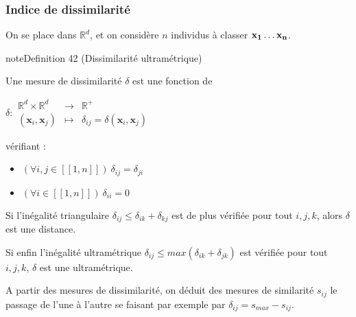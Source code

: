 \documentclass[letterpaper,10pt,french]{sphinxmanual}
\begin{document}
\subsubsection{Indice de dissimilarité}
\label{\detokenize{clustering:indice-de-dissimilarite}}
\sphinxAtStartPar
On se place dans \(\mathbb R^d\), et on considère \(n\) individus à classer \({\bf x_1}\ldots {\bf x_n}\).
\label{clustering:definition-2}
\begin{sphinxadmonition}{note}{Definition 42 (Dissimilarité \sphinxhyphen{} ultramétrique)}



\sphinxAtStartPar
Une mesure de dissimilarité \(\delta\) est une fonction de

\sphinxAtStartPar
\(
 \delta: \begin{array}{ccc}
\mathbb{R}^d\times\mathbb{R}^d &\rightarrow &\mathbb{R}^+\\
(\mathbf x_i,\mathbf x_j)&\mapsto & \delta_{ij} = \delta(\mathbf x_i,\mathbf x_j)
\end{array}
\)

\sphinxAtStartPar
vérifiant :
\begin{itemize}
\item {} 
\sphinxAtStartPar
\((\forall i,j\in[\![1, n]\!])\ \delta_{ij}=\delta_{ji}\)

\item {} 
\sphinxAtStartPar
\((\forall i\in[\![1, n]\!])\ \delta_{ii}= 0\)

\end{itemize}

\sphinxAtStartPar
Si l’inégalité triangulaire \(\delta_{ij}\leq \delta_{ik}+\delta_{kj}\) est de plus vérifiée pour tout \(i,j,k\), alors \(\delta\) est une distance.

\sphinxAtStartPar
Si enfin l’inégalité ultramétrique  \(\delta_{ij}\leq max(\delta_{ik}+\delta_{jk})\) est  vérifiée pour tout \(i,j,k\), \(\delta\) est une ultramétrique.
\end{sphinxadmonition}

\sphinxAtStartPar
A partir des mesures de dissimilarité, on déduit des mesures de similarité \(s_{ij}\) le passage de l’une à l’autre se faisant par exemple par \(\delta_{ij} = s_{max}-s_{ij}\).
\end{document}
